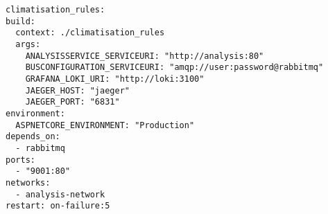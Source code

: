 \begin{lstlisting}[style=yaml,caption={Ejemplo de declaración de despliegue de un servicio en Docker Compose},captionpos=b, label=ls:docker-compose-example]
climatisation_rules:
build:
  context: ./climatisation_rules
  args:
    ANALYSISSERVICE_SERVICEURI: "http://analysis:80"
    BUSCONFIGURATION_SERVICEURI: "amqp://user:password@rabbitmq"
    GRAFANA_LOKI_URI: "http://loki:3100"
    JAEGER_HOST: "jaeger"
    JAEGER_PORT: "6831"
environment:
  ASPNETCORE_ENVIRONMENT: "Production"
depends_on:
  - rabbitmq
ports:
  - "9001:80"
networks:
  - analysis-network
restart: on-failure:5
  \end{lstlisting}

